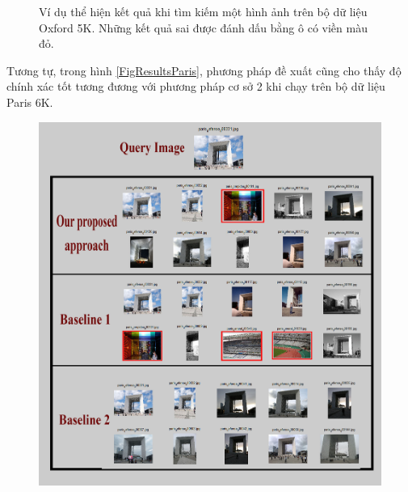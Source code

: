 \begin{figure}[!htbp]
\begin{center}
    \fi
    \caption[Ví dụ thể hiện kết quả khi tìm kiếm một hình ảnh trên bộ dữ liệu Oxford 5K]{Ví dụ thể hiện kết quả khi tìm kiếm một hình ảnh trên bộ dữ liệu Oxford 5K. Những kết quả sai được đánh dấu bằng ô có viền màu đỏ.}
    \label{FigResultsOxf}
  \end{center}
\end{figure}

Tương tự, trong hình \ref{FigResultsParis}, phương pháp đề xuất cũng cho thấy độ chính xác tốt tương đương với phương pháp cơ sở 2 khi chạy trên bộ dữ liệu Paris 6K.

\begin{figure}[!htbp]
  \begin{center}
    \leavevmode
    \ifpdf
      \includegraphics[scale=0.2]{resParis6k}
    \else

\end{center}
\end{figure}
